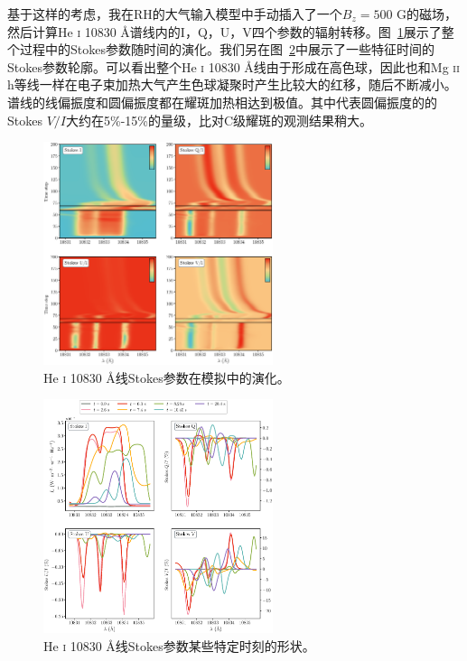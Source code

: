 基于这样的考虑，我在RH的大气输入模型中手动插入了一个$B_z = 500$ G的磁场，然后计算He \textsc{i} 10830 \mbox{\AA}谱线内的I，Q，U，V四个参数的辐射转移。图~\ref{fig:3.14}展示了整个过程中的Stokes参数随时间的演化。我们另在图~\ref{fig:3.15}中展示了一些特征时间的Stokes参数轮廓。可以看出整个He \textsc{i} 10830 \mbox{\AA}线由于形成在高色球，因此也和Mg \textsc{ii} h等线一样在电子束加热大气产生色球凝聚时产生比较大的红移，随后不断减小。谱线的线偏振度和圆偏振度都在耀斑加热相达到极值。其中代表圆偏振度的的Stokes $V/I$大约在5\%-15\%的量级，比\textcites{Anan2018}对C级耀斑的观测结果稍大。
\begin{figure}
	\centering
	\includegraphics[width=0.6\textwidth]{figs/HeI_Stokes_imshow}
	\caption{He \textsc{i} 10830 \mbox{\AA}线Stokes参数在模拟中的演化。}
	\label{fig:3.14}
\end{figure}

\begin{figure}
	\centering
	\includegraphics[width=0.6\textwidth]{figs/HeI_Stokes_spec}
	\caption{He \textsc{i} 10830 \mbox{\AA}线Stokes参数某些特定时刻的形状。}
	\label{fig:3.15}
\end{figure}
